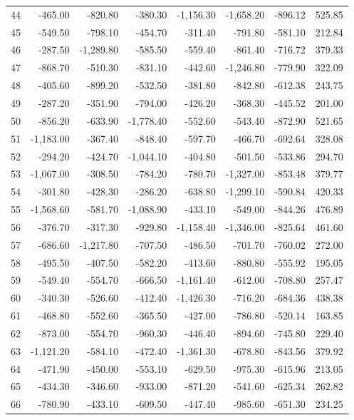 \begin{longtable}{rrrrrrrr}
44 & -465.00 & -820.80 & -380.30 & -1,156.30 & -1,658.20 & -896.12 & 525.85  \\
45 & -549.50 & -798.10 & -454.70 & -311.40 & -791.80 & -581.10 & 212.84  \\
46 & -287.50 & -1,289.80 & -585.50 & -559.40 & -861.40 & -716.72 & 379.33  \\
47 & -868.70 & -510.30 & -831.10 & -442.60 & -1,246.80 & -779.90 & 322.09  \\
48 & -405.60 & -899.20 & -532.50 & -381.80 & -842.80 & -612.38 & 243.75  \\
49 & -287.20 & -351.90 & -794.00 & -426.20 & -368.30 & -445.52 & 201.00  \\
50 & -856.20 & -633.90 & -1,778.40 & -552.60 & -543.40 & -872.90 & 521.65  \\
51 & -1,183.00 & -367.40 & -848.40 & -597.70 & -466.70 & -692.64 & 328.08  \\
52 & -294.20 & -424.70 & -1,044.10 & -404.80 & -501.50 & -533.86 & 294.70  \\
53 & -1,067.00 & -308.50 & -784.20 & -780.70 & -1,327.00 & -853.48 & 379.77  \\
54 & -301.80 & -428.30 & -286.20 & -638.80 & -1,299.10 & -590.84 & 420.33  \\
55 & -1,568.60 & -581.70 & -1,088.90 & -433.10 & -549.00 & -844.26 & 476.89  \\
56 & -376.70 & -317.30 & -929.80 & -1,158.40 & -1,346.00 & -825.64 & 461.60  \\
57 & -686.60 & -1,217.80 & -707.50 & -486.50 & -701.70 & -760.02 & 272.00  \\
58 & -495.50 & -407.50 & -582.20 & -413.60 & -880.80 & -555.92 & 195.05  \\
59 & -549.40 & -554.70 & -666.50 & -1,161.40 & -612.00 & -708.80 & 257.47  \\
60 & -340.30 & -526.60 & -412.40 & -1,426.30 & -716.20 & -684.36 & 438.38  \\
61 & -468.80 & -552.60 & -365.50 & -427.00 & -786.80 & -520.14 & 163.85  \\
62 & -873.00 & -554.70 & -960.30 & -446.40 & -894.60 & -745.80 & 229.40  \\
63 & -1,121.20 & -584.10 & -472.40 & -1,361.30 & -678.80 & -843.56 & 379.92  \\
64 & -471.90 & -450.00 & -553.10 & -629.50 & -975.30 & -615.96 & 213.05  \\
65 & -434.30 & -346.60 & -933.00 & -871.20 & -541.60 & -625.34 & 262.82  \\
66 & -780.90 & -433.10 & -609.50 & -447.40 & -985.60 & -651.30 & 234.25  \\

\end{longtable}
